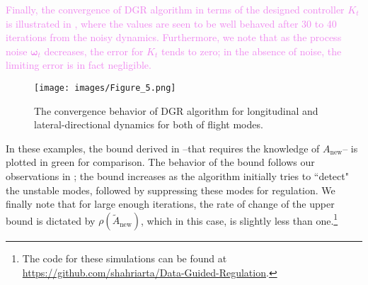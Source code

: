 \documentclass[journal]{IEEEtran}
\theoremstyle{definition}
\theoremstyle{remark}
\newcommand\oomega{{\bm \omega}}
\begin{document}
    
    
    
    
	
	\textcolor{violet}{Finally, the convergence of DGR algorithm in terms of the designed controller $K_t$ is illustrated in , where the values are seen to be well behaved after 30 to 40 iterations from the noisy dynamics.
	Furthermore, we note that as the process noise $\oomega_t$ decreases, the error for $K_t$ tends to zero; in the absence of noise, the limiting error is in fact negligible.}
	
	\begin{figure}[!t]
    \centering
    \texttt{[image: images/Figure\_5.png]}
    \caption{The convergence behavior of \ac{DGR} algorithm for longitudinal and lateral-directional dynamics for both of flight modes.}
    \label{fig:convergence}
    \vspace{-0.3cm}
    \end{figure}
    
	{\color{Blue}
	In these examples, the bound derived in --that requires the knowledge of $A_{\text{new}}$-- is plotted in green for comparison.}
	The behavior of the bound follows our observations in ;
	the bound increases as the algorithm initially tries to ``detect" the unstable modes, followed by suppressing these modes for regulation.
	We finally note that for large enough iterations, the rate of change of the upper bound is dictated by $\rho(\widetilde{A}_\text{new})$, which in this case, is slightly less than one.\footnote{The code for these simulations can be found at \url{https://github.com/shahriarta/Data-Guided-Regulation}.}
	
\end{document}
